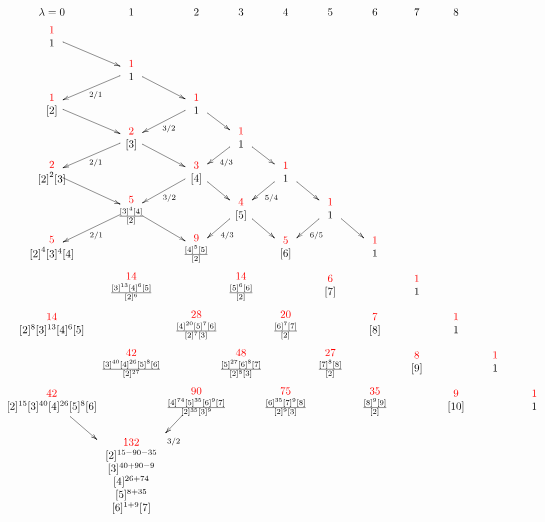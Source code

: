 %
\newcommand{\sqrr}{\square\ar[r]}
%
%
\[ { } \hspace{-.253in}
%
\xymatrix @C=15pt @R=1pt {
  {\lambda=0  }       &  1             &  2      &  3  &  4  &  5   & 6 & 7 & 8 
  \\  %
    {\du{1}{1} }\ar[dr]
    \\
& {\du{1}{1}}\ar[dr]\ar[dl]^{2/1}
\\ 
{\du{1}{{[2]}} }\ar[dr]    &                  &
{\du{1}{1}}\ar[dr]\ar[dl]^{3/2}
\\
&{\du{2}{[3]}} \ar[dr]\ar[dl]^{2/1}               &     &
{\du{1}{1}}\ar[dr]\ar[dl]^{4/3}
\\ 
{ \du{2}{{[ 2]}^2 [3]}}  \ar[dr]  &                     &
{\du{3}{[4]} }  \ar[dr]\ar[dl]^{3/2}  &    &
{\du{1}{1} } \ar[dr]\ar[dl]^{5/4}
\\
    & {\du{5}{{\frac{ [3]^4 [4]}{[2]}^{}}}}  \ar[dr]\ar[dl]^{2/1}   &  &
    {\du{4}{[5]}} \ar[dr]\ar[dl]^{4/3} &  &
    {\du{1}{1}} \ar[dr]\ar[dl]^{6/5}
    \\ 
    {\du{5}{{[2]}^4 [3]^4 [4]}} &              &
    {\du{9}{{\frac{[4]^5[5]}{[2]}^{}}}} &    &
    {\du{5}{[6]}} & &{ \du{1}{1} }
    \\ 
    &{\du{14}{\frac{[3]^{13}[4]^6[5]}{[2]^{6}}}} &&
    {\du{14}{\frac{[5]^6[6]}{[2]^{}}}} &&
    {\du{6}{[7]}} &&
    {\du{1}{1}}
 \\
   {\du{14}{[2]^8[3]^{13}[4]^6[5]}}  &&
   {\du{28}{\frac{[4]^{20}[5]^7[6]}{[2]^{7}[3]^{}}}} &&
   {\du{20}{\frac{[6]^7[7]}{[2]^{}}}} &&
   {\du{7}{[8]}}  &&
   {\du{1}{1}} \\
   & {\du{42}{\frac{[3]^{40}[4]^{26}[5]^8[6]}{[2]^{27}}}} &&
   {\du{48}{\frac{[5]^{27}[6]^8[7]}{[2]^{8}[3]^{}}}} &&
   {\du{27}{\frac{[7]^8[8]}{[2]^{}}}} &&
   {\du{8}{[9]}} &&
   {\du{1}{1}}
 \\
   {\du{42}{[2]^{15}[3]^{40}[4]^{26}[5]^{8}[6]}}\ar[dr] &&
   {\du{90}{\frac{[4]^{74}[5]^{35}[6]^{9}[7]}{[2]^{35}[3]^{9}}}}\ar[dl]^{3/2} &&
   {\du{75}{
       \frac{  [6]^{35}[7]^{9}[8]}{[2]^{9}[3]^{}}}} &&
   {\du{35}{\frac{[8]^9[9]}{[2]^{}}}} &&
   {\du{9}{[10]}} &&
   {\du{1}{1}}
   \\
   & { \begin{array}{c} { } \\ \textcolor{red}{132} \\ 
        {[2]^{15-90-35}} \\ {[3]^{40+90-9}} \\
        {[4]^{26+74}} \\ {[5]^{8+35}} \\ {[6]^{1+9}[7]}
        \end{array} }
}
\]

